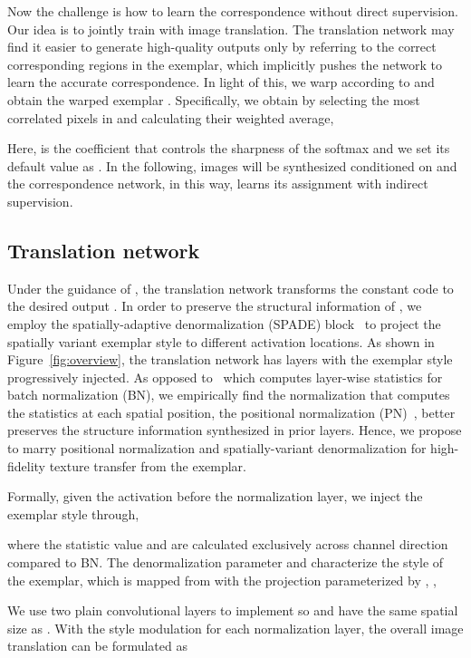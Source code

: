 \documentclass[10pt,twocolumn,letterpaper]{article}
\begin{document}
Now the challenge is how to learn the correspondence without direct supervision. Our idea is to jointly train with image translation. The translation network may find it easier to generate high-quality outputs only by referring to the correct corresponding regions in the exemplar, which implicitly pushes the network to learn the accurate correspondence. In light of this, we warp  according to  and obtain the warped exemplar . Specifically, we obtain  by selecting the most correlated pixels in  and calculating their weighted average,

Here,  is the coefficient that controls the sharpness of the softmax
and we set its default value as . In the following, images will be synthesized conditioned on  and the correspondence network, in this way, learns its assignment with indirect supervision.

\subsection{Translation network}
\label{sec:translation}
Under the guidance of , the translation network  transforms the constant code  to the desired output . In order to preserve the structural information of , we employ the spatially-adaptive denormalization (SPADE) block~\cite{park2019semantic} to project the spatially variant exemplar style to different activation locations. As shown in Figure~\ref{fig:overview}, the translation network has  layers with the exemplar style progressively injected. As opposed to~\cite{park2019semantic} which computes layer-wise statistics for batch normalization (BN), we empirically find the normalization that computes the statistics at each spatial position, the positional normalization (PN)~\cite{2019arXiv190704312L}, better preserves the structure information synthesized in prior layers. Hence, we propose to marry positional normalization and spatially-variant denormalization for high-fidelity texture transfer from the exemplar. 

Formally, given the activation  before the  normalization layer, we inject the exemplar style through,

where the statistic value  and  are calculated exclusively across channel direction compared to BN. The denormalization parameter  and  characterize the style of the exemplar, which is mapped from  with the projection  parameterized by , \ie,

We use two plain convolutional layers to implement  so  and  have the same spatial size as . With the style modulation for each normalization layer, the overall image translation can be formulated as
\end{document}
